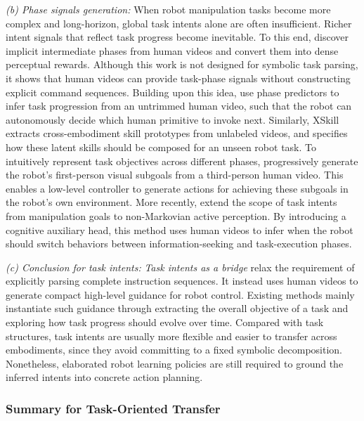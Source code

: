 \documentclass[Afour,sageh,times]{sagej}
\begin{document}
\textit{(b) Phase signals generation:} When robot manipulation tasks become more complex and long-horizon, global task intents alone are often insufficient. Richer intent signals that reflect task progress become inevitable. To this end, \cite{sermanet2016unsupervised} discover implicit intermediate phases from human videos and convert them into dense perceptual rewards. Although this work is not designed for symbolic task parsing, it shows that human videos can provide task-phase signals without constructing explicit command sequences. Building upon this idea, \cite{yu2018one_hil} use phase predictors to infer task progression from an untrimmed human video, such that the robot can autonomously decide which human primitive to invoke next. Similarly, XSkill~\citep{xu2023xskill} extracts cross-embodiment skill prototypes from unlabeled videos, and specifies how these latent skills should be composed for an unseen robot task. To intuitively represent task objectives across different phases, \cite{sharma2019third} progressively generate the robot's first-person visual subgoals from a third-person human video. This enables a low-level controller to generate actions for achieving these subgoals in the robot's own environment. More recently, \cite{li2026act} extend the scope of task intents from manipulation goals to non-Markovian active perception. By introducing a cognitive auxiliary head, this method uses human videos to infer when the robot should switch behaviors between information-seeking and task-execution phases.


\textit{(c) Conclusion for task intents:} \textit{Task intents as a bridge} relax the requirement of explicitly parsing complete instruction sequences. It instead uses human videos to generate compact high-level guidance for robot control. Existing methods mainly instantiate such guidance through extracting the overall objective of a task and exploring how task progress should evolve over time. Compared with task structures, task intents are usually more flexible and easier to transfer across embodiments, since they avoid committing to a fixed symbolic decomposition. Nonetheless, elaborated robot learning policies are still required to ground the inferred intents into concrete action planning.

\subsubsection{Summary for Task-Oriented Transfer}
\end{document}
